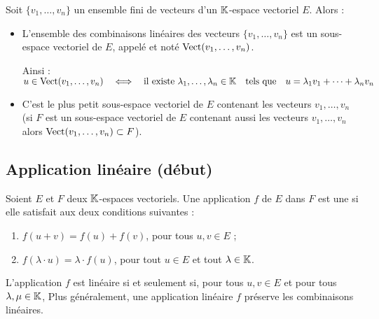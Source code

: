 \documentclass[10pt,class=article,crop=false]{standalone}
\begin{document}
\begin{multicols}{2}
\begin{theoreme}
	\label{th:engendre}
	Soit  $\{v_1, \dots , v_n\}$ un ensemble fini de vecteurs d'un
	$\mathbb{K}$-espace vectoriel $E$.
	Alors :
	\begin{itemize}
		\item L'ensemble des combinaisons linéaires des vecteurs
		$\{v_1, \dots , v_n\}$ est un sous-espace vectoriel de $E$,
		appelé  et noté $\operatorname{Vect} (v_1, \dots , v_n )$.
		
		Ainsi :
		$u \in \operatorname{Vect}( v_1, \dots , v_n ) \quad \Longleftrightarrow \quad
			\text{il existe} \ \lambda_1, \dots , \lambda_n \in \mathbb{K} \quad \text{tels que} \quad
			u=\lambda_1v_1+ \dots+\lambda_nv_n$
		
		\item C'est le plus petit sous-espace vectoriel de $E$
		contenant les vecteurs  $v_1, \ldots , v_n$ (si	$F$ est un sous-espace vectoriel de $E$ contenant aussi les vecteurs $v_1, \ldots , v_n$ alors $\operatorname{Vect} (v_1, \dots , v_n ) \subset F$).
		
	\end{itemize}
	
\end{theoreme}


\subsection{Application linéaire (début)}

\begin{definition}
	Soient $E$ et $F$ deux $\mathbb{K}$-espaces vectoriels.
	Une application $f$ de $E$ dans $F$ est une  si elle satisfait aux deux conditions suivantes :
	\begin{enumerate}
		\item $f(u+v)=f(u)+f(v)$, pour tous $u, v \in  E$ ;
		\item $f(\lambda \cdot u)=\lambda \cdot f(u)$, pour tout $u \in E$ et tout $\lambda \in \mathbb{K}$.
	\end{enumerate}
\end{definition}

L'application $f$ est linéaire si et seulement si,
pour tous $u,v \in E$ et pour tous $\lambda, \mu \in \mathbb{K}$,
Plus généralement, une application linéaire $f$ préserve les combinaisons linéaires.


\end{multicols}
\end{document}
